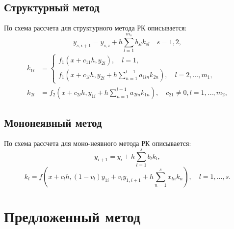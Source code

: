 \documentclass[a4paper,article,14pt]{extarticle}
\begin{document}
\subsection{Структурный метод}
По \cite{OlemskoyBook2009} схема рассчета для структурного метода РК описывается:
\begin{equation}
    y_{s,i+1} = y_{s,i} + h \sum_{l=1}^{m_{s}} b_{sl} k_{sl} \quad s = 1, 2,
\end{equation}
\begin{equation}
\begin{aligned}
    k_{1l} &= 
\begin{cases}
    f_{1}(x + c_{11} h, y_{2i}), \quad l = 1, \\
    f_{1}(x + c_{1l} h, y_{2i} + h \sum_{n=1}^{l-1} a_{1ln} k_{2n}), \quad l = 2, \dotsc, m_{1},
\end{cases}
    \\k_{2l} &= 
    f_{2}(x + c_{2l} h, y_{1i} + h \sum_{n=1}^{l-1} a_{2ln} k_{1n}), \quad c_{21} \not= 0, l = 1, \dotsc, m_{2},
\end{aligned}
\end{equation}
\subsection{Мононеявный метод}\label{subsecMIRK}
По \cite{mirk} схема рассчета для моно-неявного метода РК описывается:
\begin{equation}
    y_{i+1} = y_{i} + h \sum_{l=1}^{s} b_{l} k_{l},
\end{equation}
\begin{equation}
    k_{l} = 
    f(x + c_{l} h, (1 - v_{l}) y_{1i} + v_{l} y_{1,i+1} + h \sum_{n=1}^{s} x_{ln} k_{n}), \quad l = 1, \dotsc, s.
\end{equation}
\pagebreak

\section{Предложенный метод}
\end{document}

